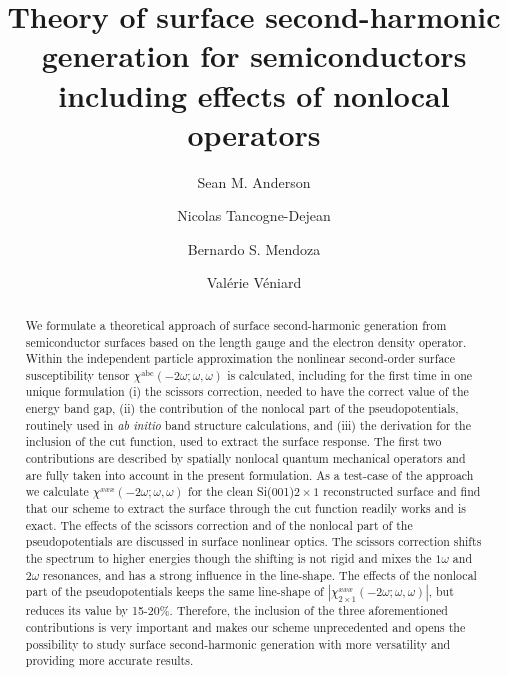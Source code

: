 \documentclass[floatfix,prb,aps,superscriptaddress,showpacs,11pt,preprint,letterpaper]{revtex4}
\begin{document}
\title{Theory of surface second-harmonic generation for 
       semiconductors including effects of nonlocal operators}

\author{Sean M. Anderson}
\author{Nicolas Tancogne-Dejean}
\author{Bernardo S. Mendoza}
\author{Val\'erie V\'eniard}

\begin{abstract}
We formulate a theoretical approach of surface second-harmonic generation 
from semiconductor surfaces based on the length gauge and the 
electron  
density operator.  
Within the independent particle approximation 
the nonlinear second-order surface susceptibility tensor
$\chi^{\mathrm{a}\mathrm{b}\mathrm{c}}(-2\omega;\omega,\omega)$    
is calculated, including for the first time in one unique formulation
(i) the scissors correction, needed to have the correct value of the
energy band gap,
(ii) the contribution of the nonlocal part of the  
pseudopotentials, routinely  used in \textit{ab initio} band structure calculations, 
and (iii) the derivation for the inclusion of the cut function, 
used to extract the surface response.
The first two contributions
are described by spatially nonlocal quantum
mechanical operators and are fully taken into account in the present formulation. 
As a test-case of the approach we calculate 
$\chi^{xxx}(-2\omega;\omega,\omega)$ for the clean Si(001)$2\times 1$
reconstructed surface and find that our scheme to extract the surface
through the cut function
readily works and is exact. The effects of the scissors correction and
of the nonlocal part of the pseudopotentials are discussed 
in surface nonlinear optics. 
The scissors correction shifts the spectrum to 
higher energies though the shifting is not rigid and mixes the 
$1\omega$ and $2\omega$ resonances, 
and has a strong influence in the line-shape. 
The 
effects of the nonlocal part of the pseudopotentials 
keeps the same line-shape of $|\chi^{xxx}_{2\times 1}(-2\omega;\omega,\omega)|$, but 
reduces its value
by 15-20\%.  
Therefore, the inclusion of the three aforementioned 
contributions is very important and 
makes our scheme unprecedented and opens the possibility to 
study surface second-harmonic generation
with more versatility and providing more accurate results.
\end{abstract}  
\end{document}

